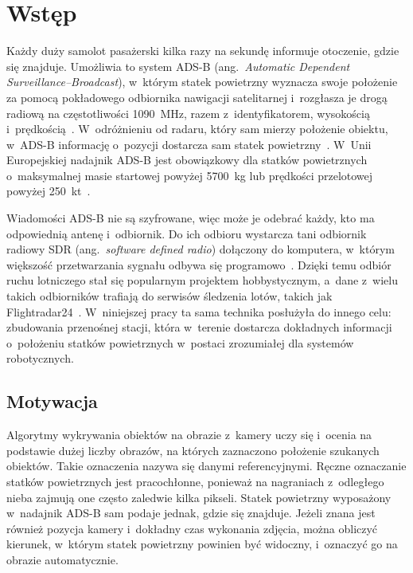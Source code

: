 \chapter{Wstęp}
\label{chap:wstep}

Każdy duży samolot pasażerski kilka razy na sekundę informuje otoczenie, gdzie się znajduje. Umożliwia to system ADS-B (ang.~\textit{Automatic Dependent Surveillance--Broadcast}), w~którym statek powietrzny wyznacza swoje położenie za pomocą pokładowego odbiornika nawigacji satelitarnej i~rozgłasza je drogą radiową na częstotliwości \SI{1090}{\mega\hertz}, razem z~identyfikatorem, wysokością i~prędkością~\cite{sun2021}. W~odróżnieniu od radaru, który sam mierzy położenie obiektu, w~ADS-B informację o~pozycji dostarcza sam statek powietrzny~\cite{strohmeier2014realities}. W~Unii Europejskiej nadajnik ADS-B jest obowiązkowy dla statków powietrznych o~maksymalnej masie startowej powyżej \SI{5700}{kg} lub prędkości przelotowej powyżej \SI{250}{kt}~\cite{ue2023_1770}.

Wiadomości ADS-B nie są szyfrowane, więc może je odebrać każdy, kto ma odpowiednią antenę i~odbiornik. Do ich odbioru wystarcza tani odbiornik radiowy SDR (ang.~\textit{software defined radio}) dołączony do komputera, w~którym większość przetwarzania sygnału odbywa się programowo~\cite{sun2021}. Dzięki temu odbiór ruchu lotniczego stał się popularnym projektem hobbystycznym, a~dane z~wielu takich odbiorników trafiają do serwisów śledzenia lotów, takich jak Flightradar24~\cite{fr24build}. W~niniejszej pracy ta sama technika posłużyła do innego celu: zbudowania przenośnej stacji, która w~terenie dostarcza dokładnych informacji o~położeniu statków powietrznych w~postaci zrozumiałej dla systemów robotycznych.

\section{Motywacja}
\label{sec:motywacja}

Algorytmy wykrywania obiektów na obrazie z~kamery uczy się i~ocenia na podstawie dużej liczby obrazów, na których zaznaczono położenie szukanych obiektów. Takie oznaczenia nazywa się danymi referencyjnymi. Ręczne oznaczanie statków powietrznych jest pracochłonne, ponieważ na nagraniach z~odległego nieba zajmują one często zaledwie kilka pikseli. Statek powietrzny wyposażony w~nadajnik ADS-B sam podaje jednak, gdzie się znajduje. Jeżeli znana jest również pozycja kamery i~dokładny czas wykonania zdjęcia, można obliczyć kierunek, w~którym statek powietrzny powinien być widoczny, i~oznaczyć go na obrazie automatycznie.


